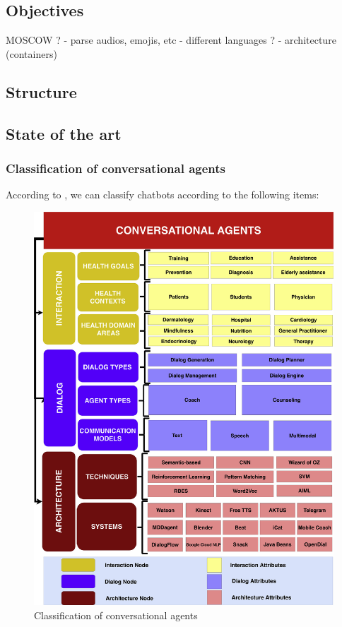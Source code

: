 \documentclass[12pt,english]{article}
\begin{document}
\subsection{Objectives}

MOSCOW ?
- parse audios, emojis, etc
- different languages ?
- architecture (containers)

\subsection{Structure}

\newpage
\subsection{State of the art}

\subsubsection{Classification of conversational agents}

According to \cite{Montenegro201956}, we can classify chatbots according to the following items:

\begin{figure}[H]
  \centering
  \includegraphics{taxonomy.jpg}
  \caption{Classification of conversational agents}
\end{figure}
\end{document}
